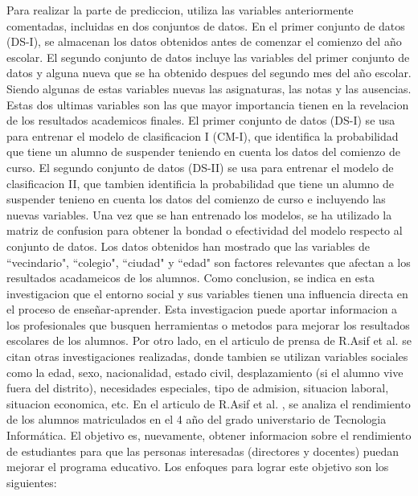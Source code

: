 \documentclass[spanish,12pt, a4paper,twoside]{paper}
\begin{document}
Para realizar la parte de prediccion, utiliza las variables anteriormente comentadas, incluidas en dos conjuntos de datos. En el primer conjunto de datos (DS-I), se almacenan los datos obtenidos antes de comenzar el comienzo del año escolar. El segundo conjunto de datos incluye las variables del primer conjunto de datos y alguna nueva que se ha obtenido despues del segundo mes del año escolar. Siendo algunas de estas variables nuevas las asignaturas, las notas y las ausencias. Estas dos ultimas variables son las que mayor importancia tienen en la revelacion de los resultados academicos finales.
\justify
El primer conjunto de datos (DS-I) se usa para entrenar el modelo de clasificacion I (CM-I), que identifica la probabilidad que tiene un alumno de suspender teniendo en cuenta los datos del comienzo de curso. El segundo conjunto de datos (DS-II) se usa para entrenar el modelo de clasificacion II, que tambien identificia la probabilidad que tiene un alumno de suspender tenieno en cuenta los datos del comienzo de curso e incluyendo las nuevas variables. Una vez que se han entrenado los modelos, se ha utilizado la matriz de confusion para obtener la bondad o efectividad del modelo respecto al conjunto de datos. Los datos obtenidos han mostrado que las variables de ``vecindario", ``colegio", ``ciudad" y ``edad" son factores relevantes que afectan a los resultados acadameicos de los alumnos.
\justify
Como conclusion, se indica en esta investigacion que el entorno social y sus variables tienen una influencia directa en el proceso de enseñar-aprender. Esta investigacion puede aportar informacion a los profesionales que busquen herramientas o metodos para mejorar los resultados escolares de los alumnos.
\justify
Por otro lado, en el articulo de prensa de R.Asif et al. \cite{AsifR2017} se citan otras investigaciones realizadas, donde tambien se utilizan variables sociales como la edad, sexo, nacionalidad, estado civil, desplazamiento (si el alumno vive fuera del distrito), necesidades especiales, tipo de admision, situacion laboral, situacion economica, etc.
\justify
En el articulo de R.Asif et al. \cite{AsifR2017}, se analiza el rendimiento de los alumnos matriculados en el 4 año del grado universtario de Tecnologia Informática. El objetivo es, nuevamente, obtener informacion sobre el rendimiento de estudiantes para que las personas interesadas (directores y docentes) puedan mejorar el programa educativo. Los enfoques para lograr este objetivo son los siguientes:
\end{document}
